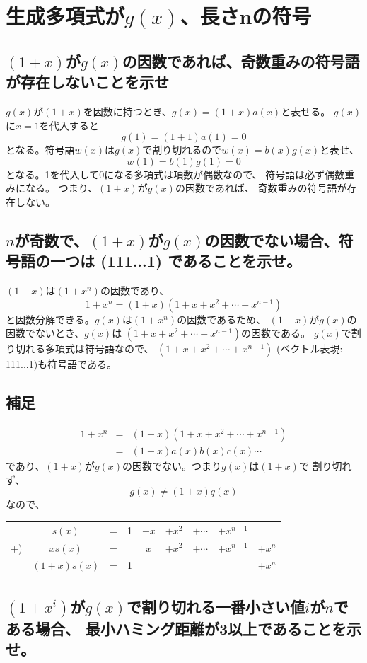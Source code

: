 \documentclass[a4paper,11pt]{jsarticle}
\begin{document}
\section{生成多項式が$g(x)$、長さnの符号}
\subsection{$(1+x)$が$g(x)$の因数であれば、奇数重みの符号語が存在しないことを示せ}
$g(x)$が$(1+x)$を因数に持つとき、$g(x)=(1+x)a(x)$と表せる。
$g(x)$に$x=1$を代入すると
\[
  g(1)=(1+1)a(1)=0
\]
となる。符号語$w(x)$は$g(x)$で割り切れるので$w(x)=b(x)g(x)$と表せ、
\[
  w(1)=b(1)g(1)=0
\]
となる。1を代入して0になる多項式は項数が偶数なので、
符号語は必ず偶数重みになる。
つまり、$(1+x)$が$g(x)$の因数であれば、
奇数重みの符号語が存在しない。

\subsection{$n$が奇数で、$(1+x)$が$g(x)$の因数でない場合、符号語の一つは (111...1) であることを示せ。}
$(1+x)$は$(1+x^n)$の因数であり、
\[
  1+x^n=(1+x)(1+x+x^2+ \cdots +x^{n-1})
\]
と因数分解できる。$g(x)$は$(1+x^n)$の因数であるため、
$(1+x)$が$g(x)$の因数でないとき、$g(x)$は
$(1+x+x^2+ \cdots + x^{n-1})$の因数である。
$g(x)$で割り切れる多項式は符号語なので、
$(1+x+x^2+ \cdots + x^{n-1})$ (ベクトル表現: 111...1)も符号語である。

\subsection*{補足}
\begin{eqnarray*}
  \label{eq1}
  1+x^n&=&(1+x)(1+x+x^2+ \cdots + x^{n-1})\\
  &=&(1+x)a(x)b(x)c(x) \cdots
\end{eqnarray*}
であり、$(1+x)$が$g(x)$の因数でない。つまり$g(x)$は$(1+x)$で
割り切れず、
\begin{equation}
  \label{eq2}
  g(x) \neq (1+x)q(x)
\end{equation}
なので、

\begin{table}[hbtp]
  \label{table:hissan}
  \centering
  \begin{tabular}{ccccccccc}
    & $s(x)$ & = & 1 & $+x$ & $+x^2$ & $+\cdots$ & $+x^{n-1}$ & \\
    +) & $xs(x)$ & = & & $x$ & $+x^2$ & $+\cdots$ & $+x^{n-1}$ & $+x^{n}$ \\ \hline
    & $(1+x)s(x)$ & = & 1 & & & & & $+x^n$
  \end{tabular}
\end{table}

\subsection{$(1+x^i)$が$g(x)$で割り切れる一番小さい値$i$が$n$である場合、 最小ハミング距離が3以上であることを示せ。}
\end{document}
